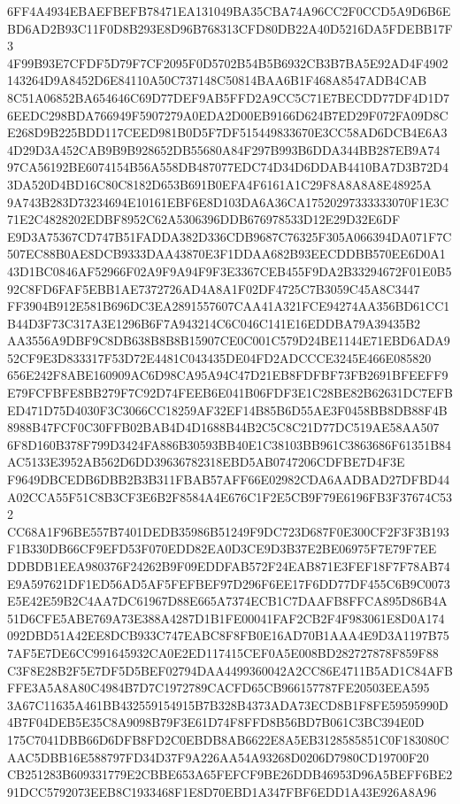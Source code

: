 \documentclass[UTF8,fontset=fandol,zihao=-4,a4paper]{ctexart}
\begin{document}
{{6FF4A4934EBAEFBEFB78471EA131049BA35CBA74A96CC2F0CCD5A9D6B6EBD6AD2B93C11F0D8B293E8D96B768313CFD80DB22A40D5216DA5FDEBB17F3
4F99B93E7CFDF5D79F7CF2095F0D5702B54B5B6932CB3B7BA5E92AD4F4902143264D9A8452D6E84110A50C737148C50814BAA6B1F468A8547ADB4CAB
8C51A06852BA654646C69D77DEF9AB5FFD2A9CC5C71E7BECDD77DF4D1D76EEDC298BDA766949F5907279A0EDA2D00EB9166D624B7ED29F072FA09D8C
E268D9B225BDD117CEED981B0D5F7DF515449833670E3CC58AD6DCB4E6A34D29D3A452CAB9B9B928652DB55680A84F297B993B6DDA344BB287EB9A74
97CA56192BE6074154B56A558DB487077EDC74D34D6DDAB4410BA7D3B72D43DA520D4BD16C80C8182D653B691B0EFA4F6161A1C29F8A8A8A8E48925A
9A743B283D73234694E10161EBF6E8D103DA6A36CA17520297333333070F1E3C71E2C4828202EDBF8952C62A5306396DDB676978533D12E29D32E6DF
E9D3A75367CD747B51FADDA382D336CDB9687C76325F305A066394DA071F7C507EC88B0AE8DCB9333DAA43870E3F1DDAA682B93EECDDBB570EE6D0A1
43D1BC0846AF52966F02A9F9A94F9F3E3367CEB455F9DA2B33294672F01E0B592C8FD6FAF5EBB1AE7372726AD4A8A1F02DF4725C7B3059C45A8C3447
FF3904B912E581B696DC3EA2891557607CAA41A321FCE94274AA356BD61CC1B44D3F73C317A3E1296B6F7A943214C6C046C141E16EDDBA79A39435B2
AA3556A9DBF9C8DB638B8B8B15907CE0C001C579D24BE1144E71EBD6ADA952CF9E3D833317F53D72E4481C043435DE04FD2ADCCCE3245E466E085820
656E242F8ABE160909AC6D98CA95A94C47D21EB8FDFBF73FB2691BFEEFF9E79FCFBFE8BB279F7C92D74FEEB6E041B06FDF3E1C28BE82B62631DC7EFB
ED471D75D4030F3C3066CC18259AF32EF14B85B6D55AE3F0458BB8DB88F4B8988B47FCF0C30FFB02BAB4D4D1688B44B2C5C8C21D77DC519AE58AA507
6F8D160B378F799D3424FA886B30593BB40E1C38103BB961C3863686F61351B84AC5133E3952AB562D6DD39636782318EBD5AB0747206CDFBE7D4F3E
F9649DBCEDB6DBB2B3B311FBAB57AFF66E02982CDA6AADBAD27DFBD44A02CCA55F51C8B3CF3E6B2F8584A4E676C1F2E5CB9F79E6196FB3F37674C532
CC68A1F96BE557B7401DEDB35986B51249F9DC723D687F0E300CF2F3F3B193F1B330DB66CF9EFD53F070EDD82EA0D3CE9D3B37E2BE06975F7E79F7EE
DDBDB1EEA980376F24262B9F09EDDFAB572F24EAB871E3FEF18F7F78AB74E9A597621DF1ED56AD5AF5FEFBEF97D296F6EE17F6DD77DF455C6B9C0073
E5E42E59B2C4AA7DC61967D88E665A7374ECB1C7DAAFB8FFCA895D86B4A51D6CFE5ABE769A73E388A4287D1B1FE00041FAF2CB2F4F983061E8D0A174
092DBD51A42EE8DCB933C747EABC8F8FB0E16AD70B1AAA4E9D3A1197B757AF5E7DE6CC991645932CA0E2ED117415CEF0A5E008BD282727878F859F88
C3F8E28B2F5E7DF5D5BEF02794DAA4499360042A2CC86E4711B5AD1C84AFBFFE3A5A8A80C4984B7D7C1972789CACFD65CB966157787FE20503EEA595
3A67C11635A461BB432559154915B7B328B4373ADA73ECD8B1F8FE59595990D4B7F04DEB5E35C8A9098B79F3E61D74F8FFD8B56BD7B061C3BC394E0D
175C7041DBB66D6DFB8FD2C0EBDB8AB6622E8A5EB3128585851C0F183080CAAC5DBB16E588797FD34D37F9A226AA54A93268D0206D7980CD19700F20
CB251283B609331779E2CBBE653A65FEFCF9BE26DDB46953D96A5BEFF6BE291DCC5792073EEB8C1933468F1E8D70EBD1A347FBF6EDD1A43E926A8A96
}}
\end{document}
